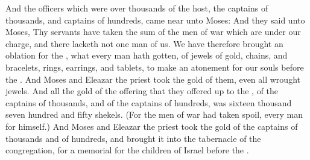 \begin{biblechapter}
\verse And the officers which were over thousands of the host, the captains of thousands, and captains of hundreds, came near unto Moses:
\verse And they said unto Moses, Thy servants have taken the sum of the men of war which are under our charge, and there lacketh not one man of us.
\verse We have therefore brought an oblation for the \LORD, what every man hath gotten, of jewels of gold, chains, and bracelets, rings, earrings, and tablets, to make an atonement for our souls before the \LORD.
\verse And Moses and Eleazar the priest took the gold of them, even all wrought jewels.
\verse And all the gold of the offering that they offered up to the \LORD, of the captains of thousands, and of the captains of hundreds, was sixteen thousand seven hundred and fifty shekels.
\verse (For the men of war had taken spoil, every man for himself.)
\verse And Moses and Eleazar the priest took the gold of the captains of thousands and of hundreds, and brought it into the tabernacle of the congregation, for a memorial for the children of Israel before the \LORD.
\end{biblechapter}

